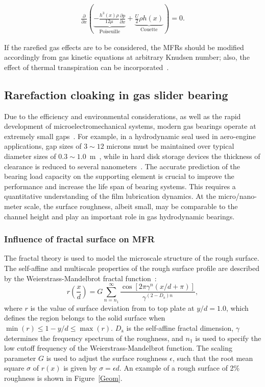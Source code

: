 \begin{eqnarray} 
\frac{\partial}{\partial x}
\left(
\underbrace{-\frac{h^3(x)\rho}{12\mu}\frac{\partial p}{\partial x}}_{\text{Poiseuille}}
+\underbrace{\frac{U}{2}\rho{}h(x)}_{\text{Couette}}
\right) 
=0.
\end{eqnarray} 


If the rarefied gas effects are to be considered, the MFRs should be modified accordingly from gas kinetic equations at arbitrary Knudsen number; also, the effect of thermal transpiration can be incorporated~\cite{Fukui1988,Cercignani2007}.





\subsection{Rarefaction cloaking in gas slider bearing}

Due to the efficiency and environmental considerations, as well as the rapid development of microelectromechanical systems, modern gas bearings operate at extremely small gaps~\cite{bailey2017}. For example, in a hydrodynamic seal used in aero-engine applications, gap sizes of $3\sim12$ microns must be maintained over typical diameter sizes of $0.3\sim1.0$~m~\cite{Sayma2002}, while in  hard disk storage devices the thickness of clearance is reduced to several nanometers~\cite{Marchon2013}. The accurate prediction of the bearing load capacity on the supporting element is crucial to improve the performance and increase the life span of bearing systems. This requires a quantitative understanding of the film lubrication dynamics. At the micro/nano-meter scale, the surface roughness, albeit small, may be comparable to the channel height and play an important role in gas hydrodynamic bearings.


\subsubsection{Influence of fractal surface on MFR}\label{sec:FR}

The fractal theory is used to model the microscale structure of the rough surface. The self-affine and multiscale properties of the rough surface profile are described by the Weierstrass-Mandelbrot fractal function~\cite{Warren1996}:
\begin{equation}
r\left(\frac{x}{d}\right)=G\sum_{n=n_1}^{\infty}\frac{\cos[2\pi\gamma^n(x/d+\pi)]}{\gamma^{(2-D_\text{a})n}},
\label{WM}
\end{equation}
where $r$ is the value of surface deviation from to top plate at $y/d=1.0$, which defines the region belongs to the solid surface when $\min(r)\le 1-y/d\le\max(r)$. $D_\text{a}$ is the self-affine fractal dimension, $\gamma$ determines the frequency spectrum of the roughness, and $n_1$ is used to specify the low cutoff frequency of the Weierstrass-Mandelbrot function. The scaling parameter $G$ is used to adjust the surface roughness $\epsilon$, such that the root mean square $\sigma$ of $r(x)$ is given by $\sigma = \epsilon {}d$. An example of a rough surface of 2\% roughness is shown in Figure~\ref{Geom}.





